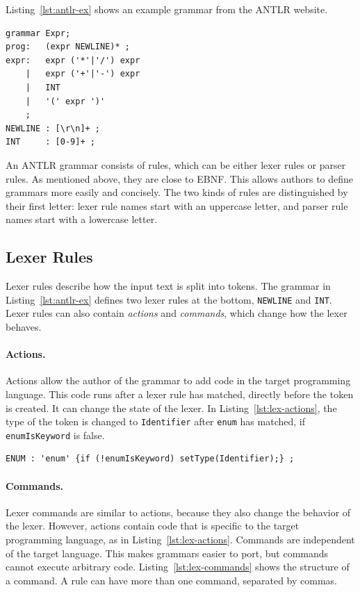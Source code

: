 \documentclass[thesis]{plai}
\begin{document}
Listing~\ref{lst:antlr-ex} shows an example grammar from the ANTLR website.

\begin{lstlisting}[caption={Example ANTLR grammar from the ANTLR website~\cite{antlr-website}.}, label={lst:antlr-ex}]
grammar Expr;
prog:   (expr NEWLINE)* ;
expr:   expr ('*'|'/') expr
    |   expr ('+'|'-') expr
    |   INT
    |   '(' expr ')'
    ;
NEWLINE : [\r\n]+ ;
INT     : [0-9]+ ;
\end{lstlisting}


An ANTLR grammar consists of rules, which can be either lexer rules or parser rules. As mentioned above, they are close to EBNF. This allows authors to define grammars more easily and concisely. The two kinds of rules are distinguished by their first letter: lexer rule names start with an uppercase letter, and parser rule names start with a lowercase letter.

\subsection{Lexer Rules}
Lexer rules describe how the input text is split into tokens. The grammar in Listing~\ref{lst:antlr-ex} defines two lexer rules at the bottom, \texttt{NEWLINE} and \texttt{INT}. Lexer rules can also contain \emph{actions} and \emph{commands}, which change how the lexer behaves.

\paragraph{Actions.}
Actions allow the author of the grammar to add code in the target programming language. This code runs after a lexer rule has matched, directly before the token is created. It can change the state of the lexer. In Listing~\ref{lst:lex-actions}, the type of the token is changed to \texttt{Identifier} after \texttt{enum} has matched, if \texttt{enumIsKeyword} is false.

\begin{lstlisting}[label={lst:lex-actions}, caption={Example of a lexer action, based on~\cite{antlr-lex-rules}.}]
ENUM : 'enum' {if (!enumIsKeyword) setType(Identifier);} ;
\end{lstlisting}

\paragraph{Commands.}
Lexer commands are similar to actions, because they also change the behavior of the lexer. However, actions contain code that is specific to the target programming language, as in Listing~\ref{lst:lex-actions}. Commands are independent of the target language. This makes grammars easier to port, but commands cannot execute arbitrary code. Listing~\ref{lst:lex-commands} shows the structure of a command. A rule can have more than one command, separated by commas.
\end{document}
